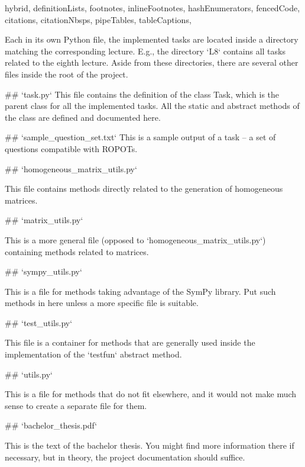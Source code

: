 \documentclass[
  digital, %
  table,   %
  twoside, %
  nolof,     %
  nolot,     %
  draft=false,
  final,
]{fithesis3}
\begin{document}
\shorthandoff{-}
\begin{markdown*}{%
  hybrid,
  definitionLists,
  footnotes,
  inlineFootnotes,
  hashEnumerators,
  fencedCode,
  citations,
  citationNbsps,
  pipeTables,
  tableCaptions,
}

Each in its own Python file, the implemented tasks are located inside a 
directory matching the corresponding lecture. E.g., the directory `L8` contains all tasks
related to the eighth lecture. Aside from these directories, there are several 
other files inside the root of the project. 


## `task.py`
This file contains the definition of the class Task, which is the parent
class for all the implemented tasks. All the static and abstract methods of the class
are defined and documented here.

## `sample_question_set.txt`
This is a sample output of a task -- a set of questions compatible with ROPOTs.

## `homogeneous_matrix_utils.py`

This file contains methods directly related to the generation of homogeneous matrices.

## `matrix_utils.py`

This is a more general file (opposed to `homogeneous_matrix_utils.py`) containing
methods related to matrices. 

## `sympy_utils.py`

This is a file for methods taking advantage of the SymPy library. Put such methods
in here unless a more specific file is suitable.

## `test_utils.py`

This file is a container for methods that are generally used inside the 
implementation of the `testfun` abstract method.

## `utils.py`

This is a file for methods that do not fit elsewhere, and it would not 
make much sense to create a separate file for them.

## `bachelor_thesis.pdf`

This is the text of the bachelor thesis. You might find more information 
there if necessary, but in theory, the project documentation should suffice.


\end{markdown*}
\shorthandon{-}
\end{document}
